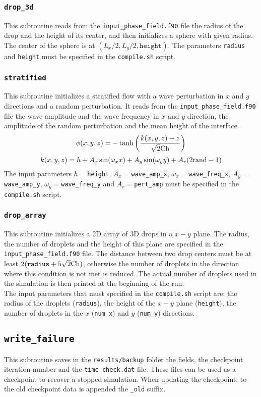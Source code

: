 \subsubsection{\texttt{drop\_3d}}
This subroutine reads from the \texttt{input\_phase\_field.f90} file the radius of the drop and the height of its center, and then initializes a sphere with given radius. The center of the sphere is at $(L_x/2,L_y/2,\texttt{height})$. The parameters \texttt{radius} and \texttt{height} must be specified in the \texttt{compile.sh} script.

\subsubsection{\texttt{stratified}}
This subroutine initializes a stratified flow with a wave perturbation in $x$ and $y$ directions and a random perturbation. It reads from the \texttt{input\_phase\_field.f90} file the wave amplitude and the wave frequency in $x$ and $y$ direction, the amplitude of the random perturbation and the mean height of the interface.
\[
\phi(x,y,z)=-\tanh\left(\frac{k(x,y,z)-z}{\sqrt{2}\textnormal{Ch}}\right)
\]
\[
k(x,y,z)=h+A_x\sin(\omega_x x)+A_y \sin(\omega_y y)+A_r(2\textnormal{rand}-1)
\]
The input parameters $h=$\texttt{height}, $A_x=$\texttt{wave\_amp\_x}, $\omega_x=$\texttt{wave\_freq\_x}, $A_y=$\texttt{wave\_amp\_y}, $\omega_y=$\texttt{wave\_freq\_y} and $A_r=$\texttt{pert\_amp} must be specified in the \texttt{compile.sh} script.

\subsubsection{\texttt{drop\_array}}
This subroutine initializes a 2D array of 3D drops in a $x-y$ plane. The radius, the number of droplets and the height of this plane are specified in the \texttt{input\_phase\_field.f90} file. The distance between two drop centers must be at least $2(\texttt{radius}+5\sqrt{2}\textnormal{Ch})$, otherwise the number of droplets in the direction where this condition is not met is reduced. The actual number of droplets used in the simulation is then printed at the beginning of the run.\\
The input parameters that must specified in the \texttt{compile.sh} script are: the radius of the droplets (\texttt{radius}), the height of the $x-y$ plane (\texttt{height}), the number of droplets in the $x$ (\texttt{num\_x}) and $y$ (\texttt{num\_y}) directions.

\subsection{\texttt{write\_failure}}
This subroutine saves in the \texttt{results/backup} folder the fields, the checkpoint iteration number and the \texttt{time\_check.dat} file. These files can be used as a checkpoint to recover a stopped simulation. When updating the checkpoint, to the old checkpoint data is appended the \texttt{\_old} suffix.


